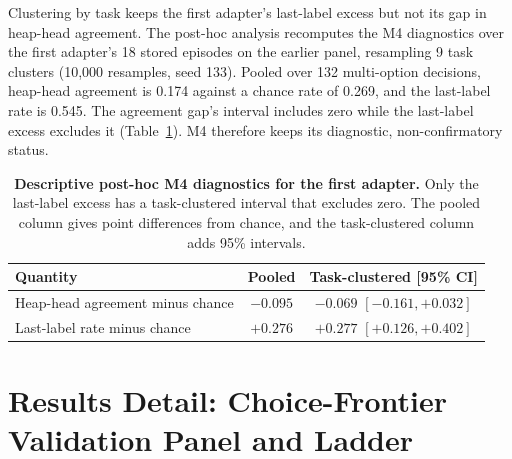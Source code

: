 Clustering by task keeps the first adapter's last-label excess but not its gap in heap-head agreement. The post-hoc analysis recomputes the M4 diagnostics over the first adapter's 18 stored episodes on the earlier panel, resampling 9 task clusters (10,000 resamples, seed 133). Pooled over 132 multi-option decisions, heap-head agreement is 0.174 against a chance rate of 0.269, and the last-label rate is 0.545. The agreement gap's interval includes zero while the last-label excess excludes it (Table~\ref{tab:appendix-m4}). M4 therefore keeps its diagnostic, non-confirmatory status.

\begin{table}[t]
\caption{\textbf{Descriptive post-hoc M4 diagnostics for the first adapter.} Only the last-label excess has a task-clustered interval that excludes zero. The pooled column gives point differences from chance, and the task-clustered column adds 95\% intervals.}
\label{tab:appendix-m4}
\centering\footnotesize
\setlength{\tabcolsep}{4pt}
\begin{tabular}{lcc}
\toprule[0.4mm]
\rowcolor{mygray}\textbf{Quantity} & \textbf{Pooled} & \textbf{Task-clustered [95\% CI]} \\
\midrule
Heap-head agreement minus chance & $-0.095$ & $-0.069$ $[-0.161, +0.032]$ \\
Last-label rate minus chance & $+0.276$ & $+0.277$ $[+0.126, +0.402]$ \\
\bottomrule
\end{tabular}
\end{table}

\section{Results Detail: Choice-Frontier Validation Panel and Ladder}
\label{app:results-ladder}

